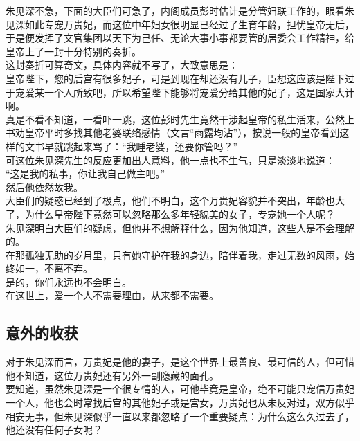 \begin{multicols}{\theparacolNo}
朱见深不急，下面的大臣们可急了，内阁成员彭时估计是分管妇联工作的，眼看朱见深如此专宠万贵妃，而这位中年妇女很明显已经过了生育年龄，担忧皇帝无后，于是便发挥了文官集团以天下为己任、无论大事小事都要管的居委会工作精神，给皇帝上了一封十分特别的奏折。\\

这封奏折可算奇文，具体内容就不写了，大致意思是：\\

皇帝陛下，您的后宫有很多妃子，可是到现在却还没有儿子，臣想这应该是陛下过于宠爱某一个人所致吧，所以希望陛下能够将宠爱分给其他的妃子，这是国家大计啊。\\

真是不看不知道，一看吓一跳，这位彭时先生竟然干涉起皇帝的私生活来，公然上书劝皇帝平时多找其他老婆联络感情（文言“雨露均沾”），按说一般的皇帝看到这样的文书早就跳起来骂了：“我睡老婆，还要你管吗？”\\

可这位朱见深先生的反应更加出人意料，他一点也不生气，只是淡淡地说道：\\

“这是我的私事，你让我自己做主吧。”\\

然后他依然故我。\\

大臣们的疑惑已经到了极点，他们不明白，这个万贵妃容貌并不突出，年龄也大了，为什么皇帝陛下竟然可以忽略那么多年轻貌美的女子，专宠她一个人呢？\\

朱见深明白大臣们的疑虑，但他并不想解释什么，因为他知道，这些人是不会理解的。\\

在那孤独无助的岁月里，只有她守护在我的身边，陪伴着我，走过无数的风雨，始终如一，不离不弃。\\

是的，你们永远也不会明白。\\

在这世上，爱一个人不需要理由，从来都不需要。\\

\subsection{意外的收获}
对于朱见深而言，万贵妃是他的妻子，是这个世界上最善良、最可信的人，但可惜他不知道，这位万贵妃还有另外一副隐藏的面孔。\\

要知道，虽然朱见深是一个很专情的人，可他毕竟是皇帝，绝不可能只宠信万贵妃一个人，他也会时常找后宫的其他妃子或是宫女，万贵妃也从未反对过，双方似乎相安无事，但朱见深似乎一直以来都忽略了一个重要疑点：为什么这么久过去了，他还没有任何子女呢？\\


\end{multicols}
